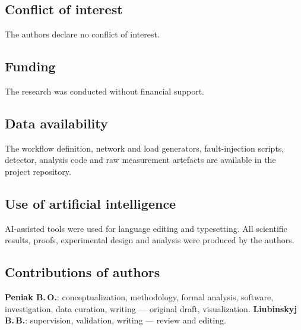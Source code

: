 \subsection*{Conflict of interest}
The authors declare no conflict of interest.

\subsection*{Funding}
The research was conducted without financial support.

\subsection*{Data availability}
The workflow definition, network and load generators, fault-injection scripts,
detector, analysis code and raw measurement artefacts are available in the
project repository.

\subsection*{Use of artificial intelligence}
AI-assisted tools were used for language editing and typesetting. All
scientific results, proofs, experimental design and analysis were produced by
the authors.

\subsection*{Contributions of authors}
\textbf{Peniak B.\,O.}: conceptualization, methodology, formal analysis,
software, investigation, data curation, writing --- original draft,
visualization.
\textbf{Liubinskyj B.\,B.}: supervision, validation, writing --- review and
editing.
